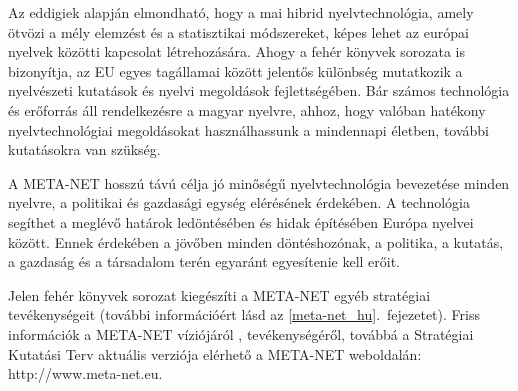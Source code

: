 \begin{multicols}{2}

  Az eddigiek alapján elmondható, hogy a mai hibrid nyelvtechnológia, amely ötvözi a mély elemzést és a statisztikai módszereket, képes lehet az európai nyel\-vek közötti kapcsolat létrehozására. Ahogy a fehér könyvek sorozata is bizonyítja, az EU egyes tagállamai között jelentős különbség mutatkozik a nyelvészeti kutatások és nyelvi megoldások fej\-lett\-sé\-gé\-ben. Bár számos technológia és erőforrás áll rendelkezésre a magyar nyelvre, ahhoz, hogy valóban hatékony nyelvtechnológiai megoldásokat használhassunk a mindennapi életben, további kutatásokra van szükség.

  A META-NET hosszú távú célja jó mi\-nő\-sé\-gű nyelvtechnológia bevezetése minden nyelvre, a politikai és gazdasági egység elérésének érdekében. A technológia segíthet a meglévő határok ledöntésében és hidak építésében Európa nyelvei között. Ennek érdekében a jövőben minden döntéshozónak, a politika, a kutatás, a gazdaság és a társadalom terén egyaránt egyesítenie kell erőit. 

  Jelen fehér könyvek sorozat kiegészíti a META-NET egyéb stratégiai te\-vé\-keny\-sé\-ge\-it (további információért lásd az \ref{meta-net_hu}.~fejezetet). Friss információk a META-NET víziójáról \cite{Meta1}, tevékenységéről, továbbá a Stratégiai Kutatási Terv aktuális ver\-zi\-ó\-ja elérhető a META-NET weboldalán: http://www.meta-net.eu.
  \end{multicols}

  \clearpage



